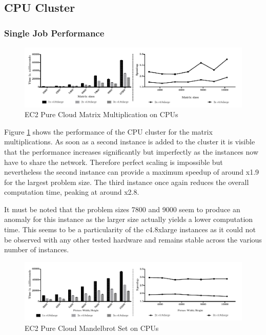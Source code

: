 \subsection{CPU Cluster}
\subsubsection*{Single Job Performance}
\begin{figure}[H]	
	\includegraphics[width=1.0\textwidth]{images/ec2_cpu_matrix_multiplication.pdf}
	\centering
	\caption{EC2 Pure Cloud Matrix Multiplication on CPUs}
	\label{img:ec2_cpu_matrix_multiplication}
\end{figure}

Figure \ref{img:ec2_cpu_matrix_multiplication} shows the performance of the CPU cluster for the matrix multiplications. As soon as a second instance is added to the cluster it is visible that the performance increases significantly but imperfectly as the instances now have to share the network. Therefore perfect scaling is impossible but nevertheless the second instance can provide a maximum speedup of around x1.9 for the largest problem size. The third instance once again reduces the overall computation time, peaking at around x2.8.

It must be noted that the problem sizes 7800 and 9000 seem to produce an anomaly for this instance as the larger size actually yields a lower computation time. This seems to be a particularity of the c4.8xlarge instances as it could not be observed with any other tested hardware and remains stable across the various number of instances.

\begin{figure}[H]	
	\includegraphics[width=1.0\textwidth]{images/ec2_cpu_mandelbrot.pdf}
	\centering
	\caption{EC2 Pure Cloud Mandelbrot Set on CPUs}
	\label{img:ec2_cpu_mandelbrot}
\end{figure}

